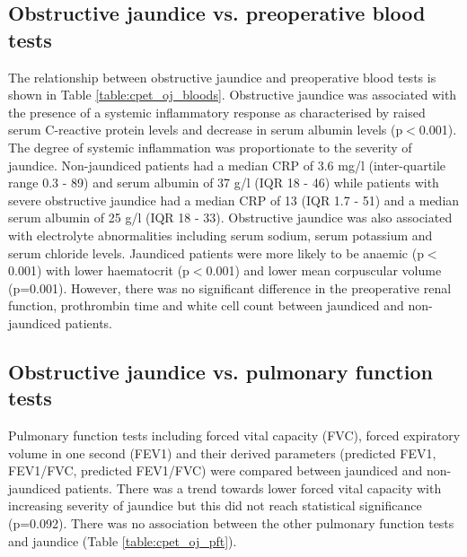 

\subsection{Obstructive jaundice vs. preoperative blood tests}
The relationship between obstructive jaundice and preoperative blood tests is shown in Table \ref{table:cpet_oj_bloods}. 
Obstructive jaundice was associated with the presence of a systemic inflammatory response as characterised by raised serum C-reactive protein levels and decrease in serum albumin levels (p$<$0.001). 
The degree of systemic inflammation was proportionate to the severity of jaundice. 
Non-jaundiced patients had a median CRP of 3.6 mg/l (inter-quartile range 0.3 - 89) and serum albumin of 37 g/l (IQR 18 - 46) while patients with severe obstructive jaundice had a median CRP of 13 (IQR 1.7 - 51) and a median serum albumin of 25 g/l (IQR 18 - 33). 
Obstructive jaundice was also associated with electrolyte abnormalities including serum sodium, serum potassium and serum chloride levels. 
Jaundiced patients were more likely to be anaemic (p$<$0.001) with lower haematocrit (p$<$0.001) and lower mean corpuscular volume (p=0.001). 
However, there was no significant difference in the preoperative renal function, prothrombin time and white cell count between jaundiced and non-jaundiced patients. 



\subsection{Obstructive jaundice vs. pulmonary function tests}
Pulmonary function tests including forced vital capacity (FVC), forced expiratory volume in one second (FEV1) and their derived parameters (predicted FEV1, FEV1/FVC, predicted FEV1/FVC) were compared between jaundiced and non-jaundiced patients. 
There was a trend towards lower forced vital capacity with increasing severity of jaundice but this did not reach statistical significance (p=0.092). 
There was no association between the other pulmonary function tests and jaundice (Table \ref{table:cpet_oj_pft}).



